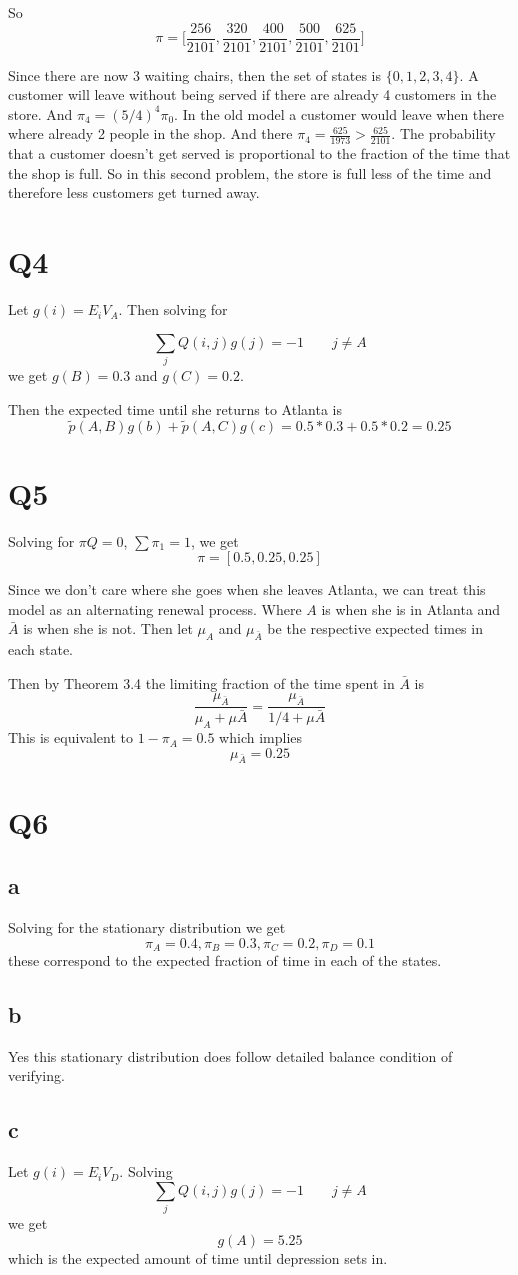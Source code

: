 \documentclass{article}
\begin{document}
So 
$$
\pi = \bigg[ \frac{256}{2101}, \frac{320}{2101}, \frac{400}{2101}, \frac{500}{2101}, \frac{625}{2101} \bigg]
$$

Since there are now 3 waiting chairs, then the set of states is $\{0, 1, 2,3,4\}$. 
A customer will leave without being served if there are already 4 customers in the store. 
And $\pi_4 = (5/4)^4 \pi_0$. In the old model a customer would leave when there where already 2 people in the shop. And there $\pi_4 =  \frac{625}{1973}  > \frac{625}{2101}$. The probability that a customer doesn't get served is proportional to the fraction of the time that the shop is full. So in this second problem, the store is full less of the time and therefore less customers get turned away.

\section*{Q4}
Let $g(i) = E_iV_A$. Then solving for

$$
\sum_j Q(i,j)g(j) = -1 \qquad j \neq A
$$
we get $g(B) = 0.3$ and $g(C) = 0.2$.

Then the expected time until she returns to Atlanta is 
$$
\tilde{p}(A,B)g(b) + \tilde{p}(A,C)g(c) = 0.5 * 0.3 + 0.5 * 0.2 = 0.25
$$

\section*{Q5}
Solving for $\pi Q = 0$, $\sum \pi_1 = 1$, we get
$$
\pi = [0.5, 0.25, 0.25]
$$

Since we don't care where she goes when she leaves Atlanta, we can treat this model as an alternating renewal process. Where $A$ is when she is in Atlanta and $\bar{A}$ is when she is not. Then let $\mu_A$ and $\mu_{\bar{A}}$ be the respective expected times in each state. 

Then by Theorem 3.4 the limiting  fraction of the time spent in $\bar{A}$ is 
$$
\frac{\mu_{\bar{A}}}{\mu_A + \mu{\bar{A}}} = \frac{\mu_{\bar{A}}}{1/4 + \mu{\bar{A}}}
$$
This is equivalent to $1 - \pi_A = 0.5$ which implies
$$
\mu_{\bar{A}} = 0.25
$$


\section*{Q6}
\subsection*{a}
Solving for the stationary distribution we get
$$
\pi_A = 0.4, \pi_B = 0.3, \pi_C = 0.2, \pi_D = 0.1
$$
these correspond to the expected fraction of time in each of the states. 

\subsection*{b}
Yes this stationary distribution does follow detailed balance condition of verifying. 

\subsection*{c}
Let $g(i) = E_iV_D$.
Solving 
$$
\sum_j Q(i,j)g(j) = -1 \qquad j \neq A
$$
we get 
$$
g(A) = 5.25
$$
which is the expected amount of time until depression sets in. 
\end{document}
